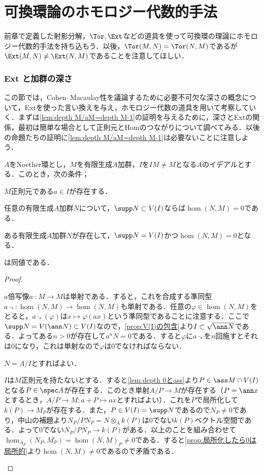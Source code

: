 \part[Homological method to ring theory]{可換環論のホモロジー代数的手法}
前章で定義した射影分解，$\Tor,\Ext$などの道具を使って可換環の理論にホモロジー代数的手法を持ち込もう．以後，$\Tor(M,N)=\Tor(N,M)$であるが$\Ext(M,N)\neq\Ext(N,M)$であることを注意してほしい．

\section{Ext と加群の深さ}
この節では，Cohen--Macaulay性を議論するために必要不可欠な深さの概念について，Extを使った言い換えを与え，ホモロジー代数の道具を用いて考察していく．まずは\ref{lem:depth M/aM=depth M-1}の証明を与えるために，深さとExtの関係，最初は簡単な場合として正則元とHomのつながりについて調べてみる．以後の命題たちの証明に\ref{lem:depth M/aM=depth M-1}は必要ないことに注意しよう．

\begin{lem}
	$A$をNoether環とし，$M$を有限生成$A$加群，$I$を$IM\neq M$となる$A$のイデアルとする．このとき，次の条件；
	\begin{sakura}
		\item $M$正則元である$a\in I$が存在する．
		\item 任意の有限生成$A$加群$N$について，$\supp N\subset V(I)$ならば$\hom(N,M)=0$である．
		\item ある有限生成$A$加群$N$が存在して，$\supp N=V(I)$かつ$\hom(N,M)=0$となる．
	\end{sakura}
	は同値である．
\end{lem}

\begin{proof}
	\begin{eqv}[3]
		\item $a$倍写像$a\cdot:M\to M$は単射である．すると，これを合成する準同型$a\cdot_ \ast:\hom(N,M)\to\hom(N,M)$も単射である．任意の$\varphi\in\hom(N,M)$をとると，$a\cdot_\ast(\varphi)$は$x\mapsto \varphi(ax)$という準同型であることに注意する．ここで$\supp N=V(\ann N)\subset V(I)$なので，\ref{prop:V(I)の包含}より$I\subset \sqrt{\ann N}$である．よってある$n>0$が存在して$a^nN=0$である．すると$\varphi$に$a\cdot_\ast$を$n$回施すとそれは$0$になり，これは単射なので$\varphi$は$0$でなければならない．
		\item $N=A/I$とすればよい．
		\item $I$は$M$正則元を持たないとする．すると\ref{lem:depth 0とass}より$P\in\ass M\cap V(I)$となる$P\in\spec A$が存在する．このとき単射$A/P\to M$が存在する（$P=\ann x$とするとき，$A/P\to M;a+P\mapsto ax$とすればよい）．これを$P$で局所化して$k(P)\to M_P$が存在する．また，$P\in V(I)=\supp N$であるので$N_P\neq 0$であり，中山の補題より$N_P/PN_P=N\otimes_A k(P)$は$0$でない$k(P)$ベクトル空間である．よって$0$でない$N_P/PN_P\to k(P)$がある．以上のことを組み合わせて$\hom_{A_P}(N_P,M_P)=\hom(N,M)_P\neq0$である．すると\ref{prop:局所化したら0は局所的}より$\hom (N,M)\neq0$であるので矛盾である．
	\end{eqv}
\end{proof}

